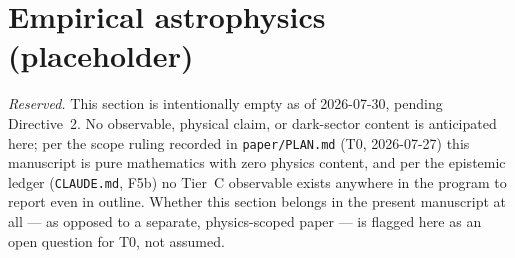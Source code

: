 \section{Empirical astrophysics (placeholder)}
\label{sec:empirical-astro}

\emph{Reserved.} This section is intentionally empty as of 2026-07-30,
pending Directive~2. No observable, physical claim, or dark-sector content is
anticipated here; per the scope ruling recorded in \texttt{paper/PLAN.md}
(T0, 2026-07-27) this manuscript is pure mathematics with zero physics
content, and per the epistemic ledger (\texttt{CLAUDE.md}, F5b) no Tier~C
observable exists anywhere in the program to report even in outline.
Whether this section belongs in the present manuscript at all — as opposed
to a separate, physics-scoped paper — is flagged here as an open question
for T0, not assumed.

